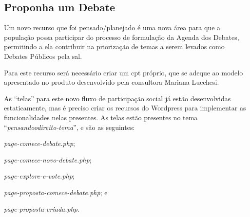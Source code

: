 \subsection{Proponha um Debate}
Um novo recurso que foi pensado/planejado é uma nova área para que a população possa participar do processo de formulação da Agenda dos Debates, permitindo a ela contribuir na priorização de temas a serem levados como Debates Públicos pela \gls{sal}.

Para este recurso será necessário criar um \gls{cpt} próprio, que se adeque ao modelo apresentado no produto desenvolvido pela consultora Mariana Lucchesi.

As ``telas'' para este novo fluxo de participação social já estão desenvolvidas estaticamente, mas é preciso criar os recursos do Wordpress para implementar as funcionalidades nelas presentes. As telas estão presentes no tema ``\textit{pensandoodireito-tema}'', e são as seguintes:
\begin{description}
\item \textit{page-comece-debate.php};
\item \textit{page-comece-novo-debate.php};
\item \textit{page-explore-e-vote.php};
\item \textit{page-proposta-comece-debate.php}; e
\item \textit{page-proposta-criada.php}.
\end{description}
